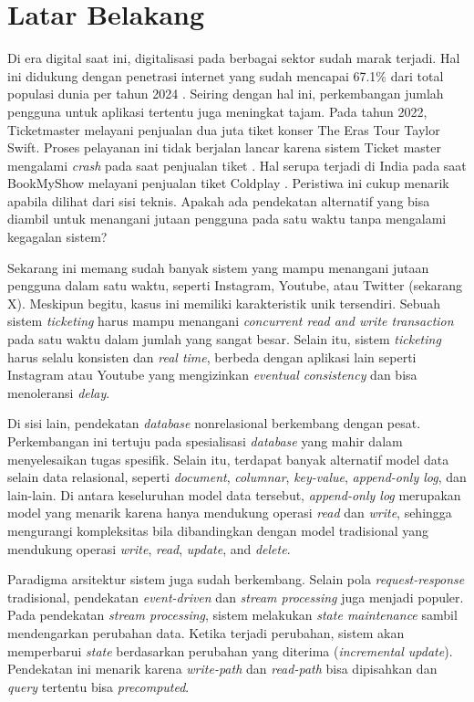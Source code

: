 \section{Latar Belakang}
\label{sec:latar-belakang}

Di era digital saat ini, digitalisasi pada berbagai sektor sudah marak terjadi. Hal ini didukung dengan penetrasi internet yang sudah mencapai 67.1\% dari total populasi dunia per tahun 2024 \parencite{internetPenetration}. Seiring dengan hal ini, perkembangan jumlah pengguna untuk aplikasi tertentu juga meningkat tajam. Pada tahun 2022, Ticketmaster melayani penjualan dua juta tiket konser The Eras Tour Taylor Swift. Proses pelayanan ini tidak berjalan lancar karena sistem Ticket master mengalami \textit{crash} pada saat penjualan tiket \parencite{swiftTicketmaster}. Hal serupa terjadi di India pada saat BookMyShow melayani penjualan tiket Coldplay \parencite{coldplayBookMyShow}. Peristiwa ini cukup menarik apabila dilihat dari sisi teknis. Apakah ada pendekatan alternatif yang bisa diambil untuk menangani jutaan pengguna pada satu waktu tanpa mengalami kegagalan sistem?

Sekarang ini memang sudah banyak sistem yang mampu menangani jutaan pengguna dalam satu waktu, seperti Instagram, Youtube, atau Twitter (sekarang X). Meskipun begitu, kasus ini memiliki karakteristik unik tersendiri. Sebuah sistem \textit{ticketing} harus mampu menangani \textit{concurrent read and write transaction} pada satu waktu dalam jumlah yang sangat besar. Selain itu, sistem \textit{ticketing} harus selalu konsisten dan \textit{real time}, berbeda dengan aplikasi lain seperti Instagram atau Youtube yang mengizinkan \textit{eventual consistency} dan bisa menoleransi \textit{delay}.

Di sisi lain, pendekatan \textit{database} nonrelasional berkembang dengan pesat. Perkembangan ini tertuju pada spesialisasi \textit{database} yang mahir dalam menyelesaikan tugas spesifik. Selain itu, terdapat banyak alternatif model data selain data relasional, seperti \textit{document}, \textit{columnar}, \textit{key-value}, \textit{append-only log}, dan lain-lain. Di antara keseluruhan model data tersebut, \textit{append-only log} merupakan model yang menarik karena hanya mendukung operasi \textit{read} dan \textit{write}, sehingga mengurangi kompleksitas bila dibandingkan dengan model tradisional yang mendukung operasi \textit{write}, \textit{read}, \textit{update}, and \textit{delete}.

Paradigma arsitektur sistem juga sudah berkembang. Selain pola \textit{request-response} tradisional, pendekatan \textit{event-driven} dan \textit{stream processing} juga menjadi populer. Pada pendekatan \textit{stream processing}, sistem melakukan \textit{state maintenance} sambil mendengarkan perubahan data. Ketika terjadi perubahan, sistem akan memperbarui \textit{state} berdasarkan perubahan yang diterima (\textit{incremental update}). Pendekatan ini menarik karena \textit{write-path} dan \textit{read-path} bisa dipisahkan dan \textit{query} tertentu bisa \textit{precomputed}.

